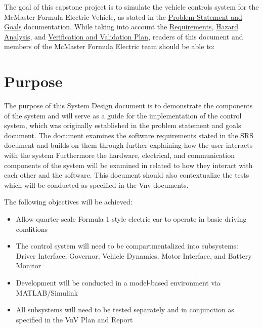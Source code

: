 \documentclass[12pt, titlepage]{article}
\begin{document}
The goal of this capstone project is to simulate the vehicle controls system for the McMaster Formula Electric Vehicle, as stated in the \href{https://github.com/Dharakverma/vehicle_control_system/blob/main/docs/ProblemStatementAndGoals/ProblemStatement.pdf}{Problem Statement and Goals} documentation. While taking into account the  \href{https://github.com/Dharakverma/vehicle_control_system/blob/main/docs/SRS/SRS.pdf}{Requirements}, \href{https://github.com/Dharakverma/vehicle_control_system/blob/main/docs/HazardAnalysis/HazardAnalysis.pdf}{Hazard Analysis}, and \href{https://github.com/Dharakverma/vehicle_control_system/blob/main/docs/VnVPlan/VnV_Plan.pdf}{Verification and Validation Plan}, readers of this document and members of the McMaster Formula Electric team should be able to:

\section{Purpose}


The purpose of this System Design document is to demonstrate the components of the system and will serve as a guide for the implementation of the control system, which was originally established in the problem statement and goals document.  The document examines the software requirements stated in the SRS document and builds on them through further explaining how the user interacts with the system Furthermore the hardware, electrical, and communication components of the system will be examined in related to how they interact with each other and the software. This document should also contextualize the tests which will be conducted as specified in the Vnv documents.

The following objectives will be achieved:
\begin{itemize}
    \item Allow quarter scale Formula 1 style electric car to operate in basic driving conditions
    \item The control system will need to be compartmentalized into subsystems: Driver Interface, Governor, Vehicle Dynamics, Motor Interface, and Battery Monitor
    \item Development will be conducted in a model-based environment via MATLAB/Simulink
    \item All subsystems will need to be tested separately and in conjunction as specified in the VnV Plan and Report
\end{itemize}
\end{document}
